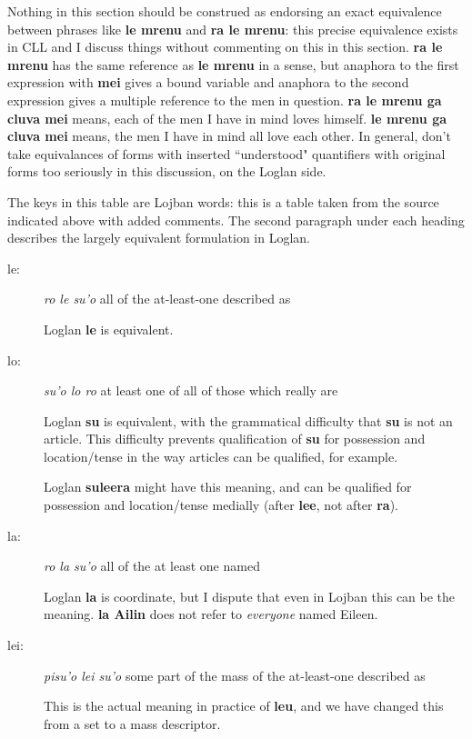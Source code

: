 \documentclass[12pt]{book}
\begin{document}
{Nothing in this section should be construed as endorsing an exact equivalence between phrases like {\bf le mrenu} and {\bf ra le mrenu}:  this precise equivalence exists in CLL and I discuss things without commenting on this in this section.  {\bf ra le mrenu} has the same reference as {\bf le mrenu} in a sense, but anaphora to the first expression with {\bf mei} gives a bound variable and anaphora to the second expression gives a multiple reference to the men in question.  {\bf ra le mrenu ga cluva mei} means, each of the men I have in mind loves himself.  {\bf le mrenu ga cluva mei} means, the men I have in mind all love each other.  In general, don't take equivalances of forms with inserted ``understood" quantifiers with original forms too seriously in this discussion, on the Loglan side.

The keys in this table are Lojban words:  this is a table taken from the source indicated above with added comments.  The second paragraph under each heading describes the largely equivalent formulation in Loglan.  

\begin{description}
\item[le: ]	{\em ro le su'o \/}	all of the at-least-one described as

Loglan {\bf le} is equivalent.

\item[lo: ]	{\em su'o lo ro \/}	at least one of all of those which really are

Loglan {\bf su\/} is equivalent, with the grammatical difficulty that {\bf su\/} is not an article.  This difficulty prevents
qualification of {\bf su} for possession and location/tense in the way articles can be qualified, for example.

Loglan {\bf suleera} might have this meaning, and can be qualified for possession and location/tense medially (after {\bf lee}, not after {\bf ra}).

\item[la: ]	{\em ro la su'o \/}	all of the at least one named

Loglan {\bf la} is coordinate, but I dispute that even in Lojban this can be the meaning.  {\bf la Ailin} does not refer to {\em everyone\/} named Eileen.

\item[lei: ]	{\em pisu'o lei su'o \/}	some part of the mass of the at-least-one described as

This is the actual meaning in practice of {\bf leu}, and we have changed this from a set to a mass descriptor.


\end{description}}
\end{document}
